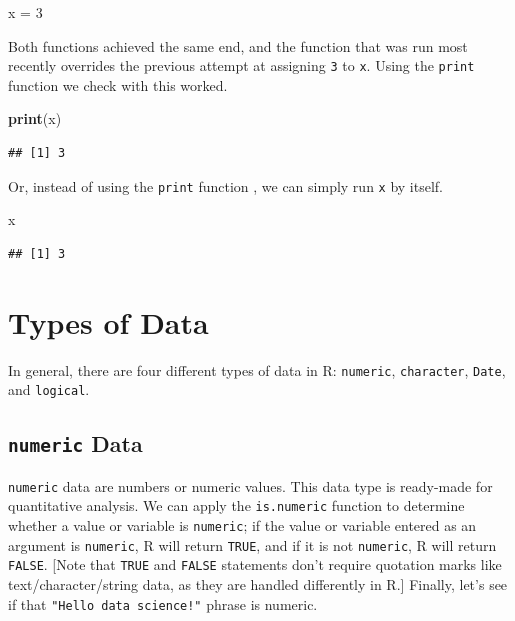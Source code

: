 \documentclass[]{book}
\newenvironment{Shaded}{\begin{snugshade}}{\end{snugshade}}
\newcommand{\KeywordTok}[1]{\textcolor[rgb]{0.13,0.29,0.53}{\textbf{#1}}}
\newcommand{\DecValTok}[1]{\textcolor[rgb]{0.00,0.00,0.81}{#1}}
\newcommand{\StringTok}[1]{\textcolor[rgb]{0.31,0.60,0.02}{#1}}
\newcommand{\NormalTok}[1]{#1}
\begin{document}
\begin{Shaded}
\begin{Highlighting}[]
\NormalTok{x =}\StringTok{ }\DecValTok{3}
\end{Highlighting}
\end{Shaded}

Both functions achieved the same end, and the function that was run most
recently overrides the previous attempt at assigning \texttt{3} to
\texttt{x}. Using the \texttt{print} function we check with this worked.

\begin{Shaded}
\begin{Highlighting}[]
\KeywordTok{print}\NormalTok{(x)}
\end{Highlighting}
\end{Shaded}

\begin{verbatim}
## [1] 3
\end{verbatim}

Or, instead of using the \texttt{print} function , we can simply run
\texttt{x} by itself.

\begin{Shaded}
\begin{Highlighting}[]
\NormalTok{x}
\end{Highlighting}
\end{Shaded}

\begin{verbatim}
## [1] 3
\end{verbatim}

\section{Types of Data}\label{types-of-data}

In general, there are four different types of data in R:
\texttt{numeric}, \texttt{character}, \texttt{Date}, and
\texttt{logical}.

\subsection{\texorpdfstring{\texttt{numeric}
Data}{numeric Data}}\label{numeric-data}

\texttt{numeric} data are numbers or numeric values. This data type is
ready-made for quantitative analysis. We can apply the
\texttt{is.numeric} function to determine whether a value or variable is
\texttt{numeric}; if the value or variable entered as an argument is
\texttt{numeric}, R will return \texttt{TRUE}, and if it is not
\texttt{numeric}, R will return \texttt{FALSE}. {[}Note that
\texttt{TRUE} and \texttt{FALSE} statements don't require quotation
marks like text/character/string data, as they are handled differently
in R.{]} Finally, let's see if that \texttt{"Hello\ data\ science!"}
phrase is numeric.
\end{document}
